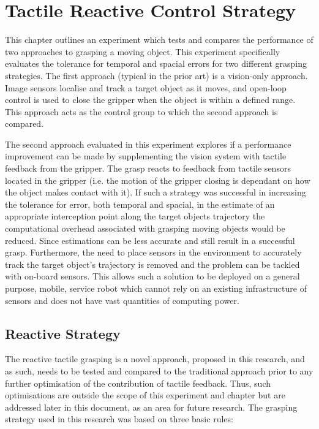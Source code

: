 \chapter{Tactile Reactive Control Strategy}\label{IROS2019}

This chapter outlines an experiment which tests and compares the performance of two approaches to grasping a moving object. This experiment specifically evaluates the tolerance for temporal and spacial errors for two different grasping strategies. The first approach (typical in the prior art) is a vision-only approach. Image sensors localise and track a target object as it moves, and open-loop control is used to close the gripper when the object is within a defined range. This approach acts as the control group to which the second approach is compared.

The second approach evaluated in this experiment explores if a performance improvement can be made by supplementing the vision system with tactile feedback from the gripper. The grasp reacts to feedback from tactile sensors located in the gripper (i.e. the motion of the gripper closing is dependant on how the object makes contact with it). If such a strategy was successful in increasing the tolerance for error, both temporal and spacial, in the estimate of an appropriate interception point along the target objects trajectory the computational overhead associated with grasping moving objects would be reduced. Since estimations can be less accurate and still result in a successful grasp. Furthermore, the need to place sensors in the environment to accurately track the target object's trajectory is removed and the problem can be tackled with on-board sensors. This allows such a solution to be deployed on a general purpose, mobile, service robot which cannot rely on an existing infrastructure of sensors and does not have vast quantities of computing power. 

\section{Reactive Strategy}\label{subsec:strategy}

The reactive tactile grasping is a novel approach, proposed in this research, and as such, needs to be tested and compared to the traditional approach prior to any further optimisation of the contribution of tactile feedback. Thus, such optimisations are outside the scope of this experiment and chapter but are addressed later in this document, as an area for future research. The grasping strategy used in this research was based on three basic rules:

